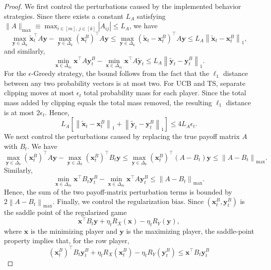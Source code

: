 \documentclass[12pt]{article}
\begin{document}
\begin{proof}
We first control the perturbations caused by the implemented behavior strategies.
Since there exists a constant $L_A$ satisfying
$\|A\|_{\max}\equiv\max_{i\in[m],\,j\in[k]}|A_{ij}|\le L_A$, we have
\begin{equation*}
\max_{\bm y\in\Delta_k}
\widetilde{\bm x}_t^\top A\bm y
-
\max_{\bm y\in\Delta_k}
(\bm x_t^B)^\top A\bm y
\le
\max_{\bm y\in\Delta_k}
(\widetilde{\bm x}_t-\bm x_t^B)^\top A\bm y
\le L_A
\left\|
\widetilde{\bm x}_t-\bm x_t^B
\right\|_1,
\end{equation*}
and similarly,
\begin{equation*}
\min_{\bm x\in\Delta_m}
\bm x^\top A\bm y_t^B
-
\min_{\bm x\in\Delta_m}
\bm x^\top A\widetilde{\bm y}_t
\le L_A
\left\|
\widetilde{\bm y}_t-\bm y_t^B
\right\|_1.
\end{equation*}
For the $\epsilon$-Greedy strategy, the bound follows from the fact that the
$\ell_1$ distance between any two probability vectors is at most two.
For UCB and TS, separate clipping moves at most $\epsilon_t$ total probability
mass for each player. Since the total mass added by clipping equals the total
mass removed, the resulting $\ell_1$ distance is at most $2\epsilon_t$.
Hence,
\[
L_A
\left[
\left\|
\widetilde{\bm x}_t-\bm x_t^B
\right\|_1
+
\left\|
\widetilde{\bm y}_t-\bm y_t^B
\right\|_1
\right]
\le
4L_A\epsilon_t.
\]
We next control the perturbations caused by replacing the true payoff matrix
$A$ with $B_t$. We have
\begin{equation*}
\max_{\bm y\in\Delta_k}
(\bm x_t^B)^\top A\bm y
-
\max_{\bm y\in\Delta_k}
(\bm x_t^B)^\top B_t\bm y
\le
\max_{\bm y\in\Delta_k}
(\bm x_t^B)^\top(A-B_t)\bm y
\le
\left\|A-B_t\right\|_{\max}.
\end{equation*}
Similarly,
\begin{equation*}
\min_{\bm x\in\Delta_m}
\bm x^\top B_t\bm y_t^B
-
\min_{\bm x\in\Delta_m}
\bm x^\top A\bm y_t^B
\le
\left\|A-B_t\right\|_{\max}.
\end{equation*}
Hence, the sum of the two payoff-matrix perturbation terms is bounded by
$2\left\|A-B_t\right\|_{\max}$.
Finally, we control the regularization bias. Since
$(\bm x_t^B,\bm y_t^B)$ is the saddle point of the regularized game
\[
\bm x^\top B_t\bm y
+
\eta_t R_X(\bm x)
-
\eta_t R_Y(\bm y),
\]
where $\bm x$ is the minimizing player and $\bm y$ is the maximizing player,
the saddle-point property implies that, for the row player,
\begin{equation*}
(\bm x_t^B)^\top B_t\bm y_t^B+
\eta_t R_X(\bm x_t^B) -
\eta_t R_Y(\bm y_t^B)
\le
\bm x^\top B_t\bm y_t^B

\end{equation*}
\end{proof}
\end{document}
